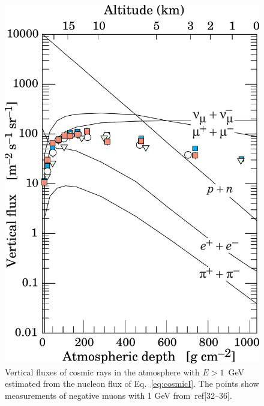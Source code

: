  \begin{figure}[]
   \centering
   \includegraphics[scale=0.20]{pics/muonflux}
   \caption{Vertical fluxes of cosmic rays in the atmosphere with $E > 1$~GeV estimated %
     from the nucleon flux of Eq.~\ref{eq:cosmicI}. The points show measurements of negative muons %
     with 1 GeV from~ref[32–36].}
   \label{fig:muonflux}
 \end{figure}


